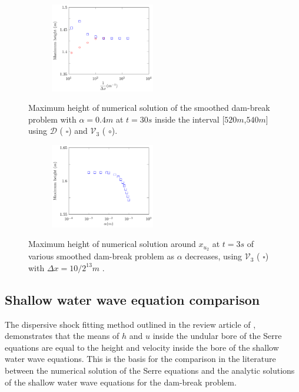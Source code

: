 \documentclass[times]{elsarticle}
\begin{document}
\begin{figure}
	\centering
	\begin{subfigure}{\textwidth}
		\centering
		\includegraphics[width=0.5\textwidth]{Figure-28.pdf}
	\end{subfigure}
	\caption{Maximum height of numerical solution of the smoothed dam-break problem with $\alpha = 0.4m$ at $t=30s$ inside the interval [$520m$,$540m$] using $\mathcal{D}$ ({\color{blue} $\square$}) and $\mathcal{V}_3$ ({\color{red} $\circ$}).}
	\label{fig:maxamp}
\end{figure}

\begin{figure}
	\centering
	\begin{subfigure}{\textwidth}
		\centering
		\includegraphics[width=0.5\textwidth]{Figure-29.pdf}
	\end{subfigure}
	\caption{Maximum height of numerical solution around $x_{u_2}$ at $t=3s$ of various smoothed dam-break problem as $\alpha$ decreases, using $\mathcal{V}_3$ ({\color{blue} $\square$}) with $\Delta x = 10 / 2^{13}m$ .}
	\label{fig:maxampa}
\end{figure}

\subsection{Shallow water wave equation comparison}
The dispersive shock fitting method outlined in the review article of \citet{El-Hoefer-2016-11}, demonstrates that the means of $h$ and $u$ inside the undular bore of the Serre equations are equal to the height and velocity inside the bore of the shallow water wave equations. This is the basis for the comparison in the literature \cite{Hank-etal-2010-2034,Mitsotakis-etal-2014} between the numerical solution of the Serre equations and the analytic solutions of the shallow water wave equations for the dam-break problem.
\end{document}
